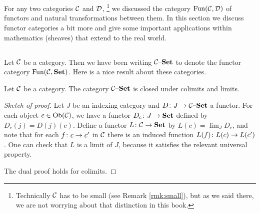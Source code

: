 \documentclass[CT4S-EN-RU]{subfiles}
\begin{document}
\section{}

For any two categories $\mathcal{C}$ and $\mathcal{D}$,
\footnote{Technically $\mathcal{C}$ has to be small (see Remark \ref{rmk:small}), but as we said there, we are not worrying about that distinction in this book.}
we discussed the category $\textnormal{Fun}(\mathcal{C},\mathcal{D})$ of functors and natural transformations between them. In this section we discuss functor categories a bit more and give some important applications within mathematics (sheaves) that extend to the real world.


\subsection{}

Let $\mathcal{C}$ be a category. Then we have been writing $\mathcal{C}{\text \textendash}{\bf Set}$ to denote the functor category $\textnormal{Fun}(\mathcal{C},{\bf Set})$. Here is a nice result about these categories.

\begin{proposition}\label{prop:inst closed under colim lim}

Let $\mathcal{C}$ be a category. The category $\mathcal{C}{\text \textendash}{\bf Set}$ is closed under colimits and limits.

\end{proposition}

\begin{proof}[Sketch of proof]

Let $J$ be an indexing category and $D\colon J\rightarrow\mathcal{C}{\text \textendash}{\bf Set}$ a functor. For each object $c\in\textnormal{Ob}(\mathcal{C})$, we have a functor $D_c\colon J\rightarrow{\bf Set}$ defined by $D_c(j)=D(j)(c)$. Define a functor $L\colon\mathcal{C}\rightarrow{\bf Set}$ by $L(c)=\lim_J D_c$, and note that for each $f\colon c\rightarrow c'$ in $\mathcal{C}$ there is an induced function $L(f)\colon L(c)\rightarrow L(c')$. One can check that $L$ is a limit of $J$, because it satisfies the relevant universal property. 

The dual proof holds for colimits.

\end{proof}
\end{document}
